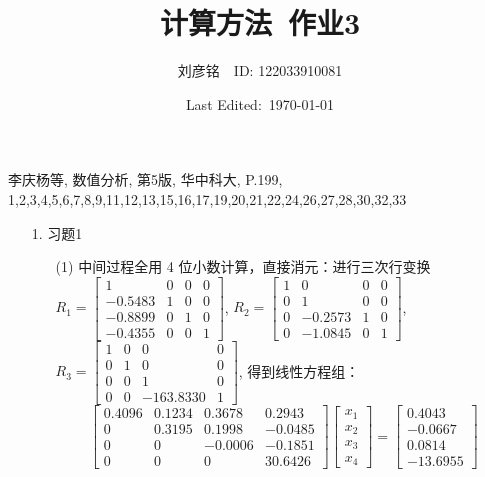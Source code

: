 \documentclass{article}
\title{计算方法\ 作业3}
\author{刘彦铭\ \ ID: 122033910081}
\date{Last Edited:\ \today}
\begin{document}
\maketitle

李庆杨等, 数值分析, 第5版, 华中科大, P.199,
1,2,3,4,5,6,7,8,9,11,12,13,15,16,17,19,20,21,22,24,26,27,28,30,32,33

\begin{itemize}
    \item [1.] 习题1
    
    \begin{itemize}
        \item [(1)] 中间过程全用 4 位小数计算，直接消元：进行三次行变换 
        $R_1 = \left[\begin{array}{cccc}
            1 &    0 &    0 &    0 \\ -0.5483 &    1 &    0 &    0 \\ -0.8899 &    0 &    1 &    0 \\ -0.4355 &    0 &    0 &    1
        \end{array}\right]$, 
        $R_2 = \left[\begin{array}{cccc}
            1 &    0 &    0 &    0 \\    0 &    1 &    0 &    0 \\    0 & -0.2573 &    1 &    0 \\    0 & -1.0845 &    0 &    1
        \end{array}\right]$,
        $R_3 = \left[\begin{array}{cccc}
            1 &    0 &    0 &    0 \\    0 &    1 &    0 &    0 \\    0 &    0 &    1 &    0 \\    0 &    0 & -163.8330 &    1
        \end{array}\right]$, 得到线性方程组：
        $$\left[\begin{array}{cccc}
            0.4096 & 0.1234 & 0.3678 & 0.2943 \\    0 & 0.3195 & 0.1998 & -0.0485 \\    0 &    0 & -0.0006 & -0.1851 \\    0 &    0 &   0 & 30.6426
        \end{array}\right] \left[\begin{array}{c}x_1\\x_2\\x_3\\x_4\end{array}\right] = \left[\begin{array}{c}
            0.4043 \\ -0.0667 \\ 0.0814 \\ -13.6955
        \end{array}\right]$$


\end{itemize}
\end{itemize}
\end{document}
